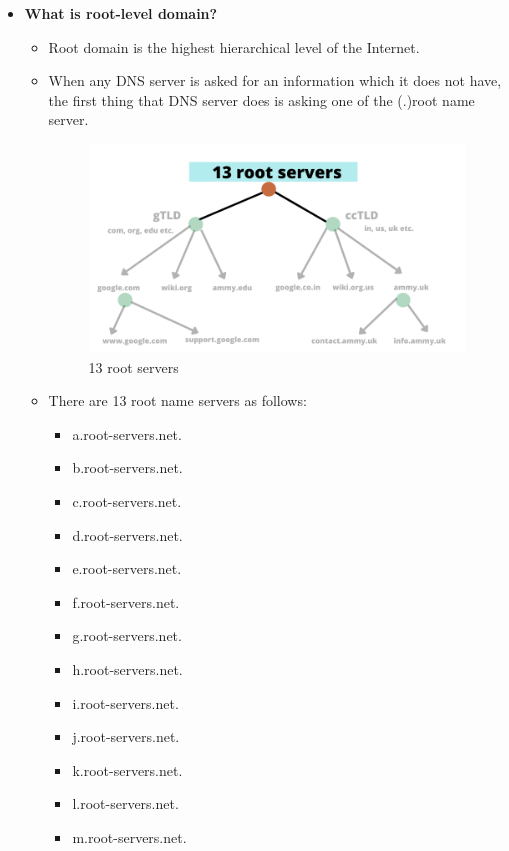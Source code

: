 \begin{flushleft}
\begin{itemize}
		
		\item \textbf{What is root-level domain?}
		\bigskip
		\begin{itemize}
			\item Root domain is the highest hierarchical level of the Internet.
			\bigskip
			\item When any DNS server is asked for an information which it does not have, the first thing that DNS server does is asking one of the (.)root name server.
			\begin{figure}[h!]
				\centering
				\includegraphics[scale=.5]{content/chapter3/images/page1.png}
				\caption{13 root servers}
				\label{fig:root_servers}
			\end{figure}		
			\item There are 13 root name servers as follows:
			\begin{itemize}
				\item a.root-servers.net.
				\item b.root-servers.net.
				\item c.root-servers.net.
				\item d.root-servers.net.
				\item e.root-servers.net.
				\item f.root-servers.net.
				\item g.root-servers.net.
				\item h.root-servers.net.
				\item i.root-servers.net.
				\item j.root-servers.net.
				\item k.root-servers.net.
				\item l.root-servers.net.
				\item m.root-servers.net.
			\end{itemize}
		\end{itemize}
		\newpage
		

\end{itemize}
\end{flushleft}
